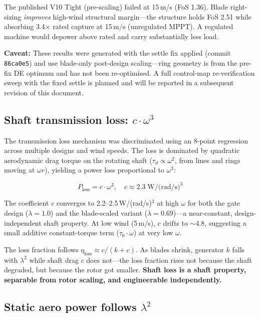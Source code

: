 \documentclass[11pt,a4paper]{article}
\begin{document}
The published V10 Tight (pre-scaling) failed at 15\,m/s (FoS 1.36).
Blade right-sizing \emph{improves} high-wind structural margin---the structure holds FoS 2.51 while absorbing 3.4$\times$ rated capture at 15\,m/s (unregulated MPPT).
A regulated machine would depower above rated and carry substantially less load.

\textbf{Caveat:} These results were generated with the settle fix applied (commit \texttt{86ca0e5}) and use blade-only post-design scaling---ring geometry is from the pre-fix DE optimum and has not been re-optimised.
A full control-map re-verification sweep with the fixed settle is planned and will be reported in a subsequent revision of this document.

\subsection{Shaft transmission loss: $c \cdot \omega^3$}

The transmission loss mechanism was discriminated using an 8-point regression across multiple designs and wind speeds.
The loss is dominated by quadratic aerodynamic drag torque on the rotating shaft ($\tau_d \propto \omega^2$, from lines and rings moving at $\omega r$), yielding a power loss proportional to $\omega^3$:

\begin{equation}
P_{\text{loss}} = c \cdot \omega^3, \quad c \approx 2.3\;\text{W/(rad/s)}^3
\end{equation}

The coefficient $c$ converges to 2.2--2.5\,W/(rad/s)$^3$ at high $\omega$ for both the gate design ($\lambda = 1.0$) and the blade-scaled variant ($\lambda = 0.69$)---a near-constant, design-independent shaft property.
At low wind (5\,m/s), $c$ drifts to $\sim$4.8, suggesting a small additive constant-torque term ($\tau_0 \cdot \omega$) at very low $\omega$.

The loss fraction follows $\eta_{\text{loss}} \approx c/(k + c)$.
As blades shrink, generator $k$ falls with $\lambda^2$ while shaft drag $c$ does not---the loss fraction rises not because the shaft degraded, but because the rotor got smaller.
\textbf{Shaft loss is a shaft property, separable from rotor scaling, and engineerable independently.}

\subsection{Static aero power follows $\lambda^2$}
\end{document}
